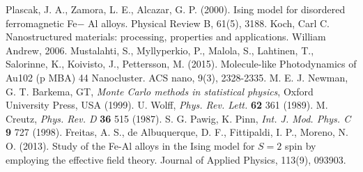 \documentclass[twocolumn,5p,12pt]{elsarticle}
\begin{document}
\begin{thebibliography}{00}
 Plascak, J. A., Zamora, L. E., Alcazar, G. P. (2000). Ising model for disordered ferromagnetic Fe− Al alloys. Physical Review B, 61(5), 3188.
 Koch, Carl C. Nanostructured materials: processing, properties and applications. William Andrew, 2006.
 Mustalahti, S., Myllyperkio, P., Malola, S., Lahtinen, T., Salorinne, K., Koivisto, J., Pettersson, M. (2015). Molecule-like Photodynamics of Au102 (p MBA) 44 Nanocluster. ACS nano, 9(3), 2328-2335.
 M. E. J. Newman, G. T. Barkema, GT,  \textit{Monte  Carlo methods in statistical physics}, {Oxford University Press, USA} \textbf{}  (1999).
 U. Wolff, \textit{Phys. Rev. Lett.} \textbf{62} 361 (1989).
 M. Creutz, \textit{Phys. Rev. D} \textbf{36}  515 (1987).
S. G. Pawig, K. Pinn, \textit{Int. J. Mod. Phys. C}  \textbf{9} 727  (1998).
 Freitas, A. S., de Albuquerque, D. F., Fittipaldi, I. P.,  Moreno, N. O. (2013). Study of the Fe-Al alloys in the Ising model for $S= 2$ spin by employing the effective field theory. Journal of Applied Physics, 113(9), 093903.
\end{thebibliography}
\end{document}
